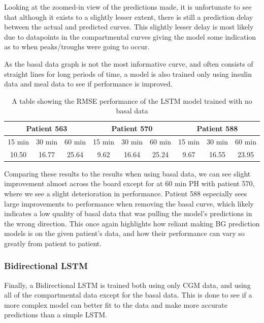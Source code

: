    Looking at the zoomed-in view of the predictions made, it is unfortunate to see that although it exists to a slightly lesser extent, there is still a prediction delay between the actual and predicted curves. This slightly lesser delay is most likely due to datapoints in the compartmental curves giving the model some indication as to when peaks/troughs were going to occur.

    As the basal data graph is not the most informative curve, and often consists of straight lines for long periods of time, a model is also trained only using insulin data and meal data to see if performance is improved.

    \begin{table}[H]
      \centering
      \caption{A table showing the RMSE performance of the LSTM model trained with no basal data}
      \begin{tabular}{|*{9}{c|}} 
        \hline
        \multicolumn{3}{|c}{Patient 563} & \multicolumn{3}{|c}{Patient 570} & \multicolumn{3}{|c|}{Patient 588} \\ \hline 
        15 min & 30 min & 60 min &15 min & 30 min & 60 min &15 min & 30 min & 60 min \\ \hline
        10.50&16.77 &25.64 &9.62&16.64 &25.24 &9.67 &16.55 &23.95 \\ \hline
      \end{tabular}
    \end{table}

    Comparing these results to the results when using basal data, we can see slight improvement almost across the board except for at 60 min PH with patient 570, where we see a slight deterioration in performance. Patient 588 especially sees large improvements to performance when removing the basal curve, which likely indicates a low quality of basal data that was pulling the model's predictions in the wrong direction. This once again highlights how reliant making BG prediction models is on the given patient's data, and how their performance can vary so greatly from patient to patient.

    \subsubsection{Bidirectional LSTM}

    Finally, a Bidirectional LSTM is trained both using only CGM data, and using all of the compartmental data except for the basal data. This is done to see if a more complex model can better fit to the data and make more accurate predictions than a simple LSTM.

